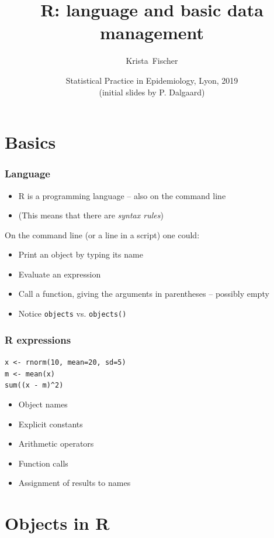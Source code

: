 \documentclass{beamer}
\title{R: language and basic data management}
\author{Krista~Fischer}
\date[Tartu 2019] %
{Statistical Practice in Epidemiology, Lyon, 2019 \\ (initial slides by P. Dalgaard)}
\newcommand{\code}[1]{\texttt{#1}}
\begin{document}
\begin{frame}
  \titlepage
\end{frame}

\section{Basics}

\begin{frame}
  \frametitle{Language}
  \begin{itemize}
  \item R is a programming language -- also on the command line
  \item (This means that there are \emph{syntax rules})
  \end{itemize}
On the command line (or a line in a script) one could:
  \begin{itemize}
  \item Print an object by typing its name
  \item Evaluate an expression 
  \item Call a function, giving the arguments in parentheses -- possibly empty
  \item Notice \code{objects} vs. \code{objects()}
  \end{itemize}
\end{frame}


\begin{frame}
  \frametitle{R expressions}
\texttt{\alert<6>{\alert<2>{x} <-} \alert<5>{rnorm(\alert<3>{10}, mean=\alert<3>{20}, 
 sd=\alert<3>{5})}\\
\alert<6>{\alert<2>{m} <-} \alert<5>{mean(\alert<2>{x})}\\
\alert<5>{sum((\alert<2>{x} \alert<4>{-} \alert<2>{m})\alert<4>{\textasciicircum}\alert<3>{2})}
}\\
\pause
  \begin{itemize}
  \item Object \alert<2>{names}
  \item Explicit \alert<3>{constants}
  \item Arithmetic \alert<4>{operators}
  \item \alert<5>{Function calls}
  \item \alert<6>{Assignment} of results to names
  \end{itemize}
\end{frame}

\section{Objects in R}
\end{document}
